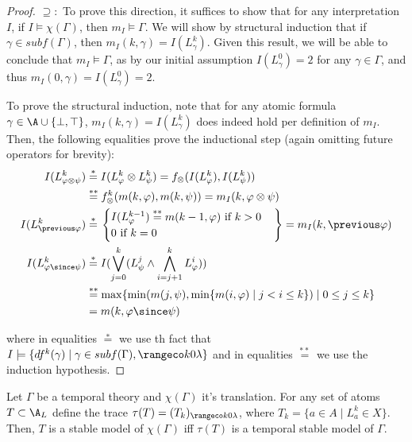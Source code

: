 \begin{proof}
  $\supseteq:$ To prove this direction, it suffices to show that for
  any interpretation $I$, if $I \models \chi(\Gamma)$, then
  $m_I \models \Gamma$. We will show by structural induction that if
  $\gamma \in subf(\Gamma)$, then $m_I(k,\gamma) = I(L^k_\gamma)$.
  Given this result, we will be able to conclude that
  $m_I \models \Gamma$, as by our initial assumption $I(L^0_\gamma)=2$
  for any $\gamma \in \Gamma$, and thus
  $m_I(0,\gamma)=I(L^0_\gamma)=2$.

  To prove the structural induction, note that for any atomic formula
  $\gamma \in \A \cup \{ \bot, \top \}$,
  $m_I(k,\gamma) = I(L^k_\gamma)$ does indeed hold per definition of
  $m_I$. Then, the following equalities prove the inductional step
  (again omitting future operators for brevity):
  \begin{align*}
  I(L^k_{\varphi \otimes \psi}) &\stackrel{*}{=} I(L^k_{\varphi} \otimes L^k_{\psi})
  =  f_{\otimes}(I(L^k_\varphi),I(L^k_\psi))\\
  &\stackrel{**}{=} f_{\otimes}^k(m(k,\varphi),m(k,\psi)) =  m_I(k,\varphi \otimes \psi)\\
  I(L^k_{\previous \varphi}) &\stackrel{*}{=} \left. \begin{cases}
    I(L^{k-1}_\varphi)  \stackrel{**}{=} m(k-1,\varphi) \text{ if } k > 0\\
    0 \text{ if } k = 0
    \end{cases} \right\} = m_I(k,\previous \varphi)\\
  I(L^k_{\varphi \since \psi}) 
    & \stackrel{*}{=}  I(\bigvee_{j=0}^{k}(L_\psi^j \wedge \bigwedge_{i=j+1}^{k}L_{\varphi}^i)) \\
    & \stackrel{**}{=} \max \{\min (m(j, \psi), \min \{m(i, \varphi) \mid j<i \leq k\}) \mid 0 \leq j \leq k\} \\
    & =  m(k,\varphi \since \psi)
  \end{align*}

  where in equalities $\stackrel{*}{=}$ we use th fact that $I \models
  \{ df^k(\gamma) \mid \gamma \in subf(\Gamma), \kinlambda
  \}$ and in equalities
  $\stackrel{**}{=}$ we use the induction hypothesis.
\end{proof}

\begin{corollary}\label{cor:bijection-of-sm}
  Let $\Gamma$ be a temporal theory and $\chi(\Gamma)$ it's
  translation. For any set of atoms $T \subset \A_L$ define the
  trace $\tau(T)=(T_k)_{\kinlambda}$, where
  $T_k = \{ a \in A \mid L_a^k \in X \}$. Then, $T$ is a stable model of
  $\chi(\Gamma)$ iff $\tau(T)$ is a temporal stable model of
  $\Gamma$.
\end{corollary}

